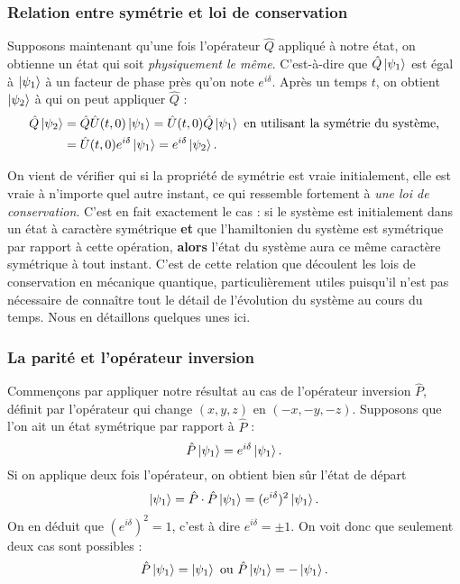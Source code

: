 \subsubsection{Relation entre symétrie et loi de conservation}
Supposons maintenant qu'une fois l'opérateur $\hat{Q}$ appliqué à notre état, on obtienne un état qui soit \textit{physiquement le même}. C'est-à-dire que $\hat{Q}\ket{\psi_1}$ est égal à $\ket{\psi_1}$ à un facteur de phase près qu'on note $e^{i\delta}$. Après un temps $t$, on obtient $\ket{\psi_2}$ à qui on peut appliquer $\hat{Q}$ :
\begin{align*}
\hat{Q}\ket{\psi_2}&=\hat{Q}\hat{U}(t,0)\ket{\psi_1}=\hat{U}(t,0)\hat{Q}\ket{\psi_1} \mbox{ en utilisant la symétrie du système,}\\
		&=\hat{U}(t,0)e^{i\delta}\ket{\psi_1}=e^{i\delta}\ket{\psi_2}.
\end{align*}

On vient de vérifier qui si la propriété de symétrie est vraie initialement, elle est vraie à n'importe quel autre instant, ce qui ressemble fortement à \textit{une loi de conservation}. C'est en fait exactement le cas : si le système est initialement dans un état à caractère symétrique \textbf{et} que l'hamiltonien du système est symétrique par rapport à cette opération, \textbf{alors} l'état du système aura ce même caractère symétrique à tout instant. C'est de cette relation que découlent les lois de conservation en mécanique quantique, particulièrement utiles puisqu'il n'est pas nécessaire de connaître tout le détail de l'évolution du système au cours du temps. Nous en détaillons quelques unes ici.

\subsubsection{La parité et l'opérateur inversion}
Commençons par appliquer notre résultat au cas de l'opérateur inversion $\hat{P}$, définit par l'opérateur qui change $(x,y,z)$ en $(-x,-y,-z)$. Supposons que l'on ait un état symétrique par rapport à $\hat{P}$ : 
\begin{equation*}
\hat{P}\ket{\psi_1} = e^{i\delta}\ket{\psi_1}.
\end{equation*}
Si on applique deux fois l'opérateur, on obtient bien sûr l'état de départ
\begin{equation*}
\ket{\psi_1} = \hat{P}\cdot\hat{P}\ket{\psi_1} = (e^{i\delta})^2\ket{\psi_1}.
\end{equation*}
On en déduit que $(e^{i\delta})^2=1$, c'est à dire $e^{i\delta}=\pm1$. On voit donc que seulement deux cas sont possibles :
\begin{equation*}
\hat{P}\ket{\psi_1} = \ket{\psi_1} \mbox{ ou } \hat{P}\ket{\psi_1} = -\ket{\psi_1}.
\end{equation*}

